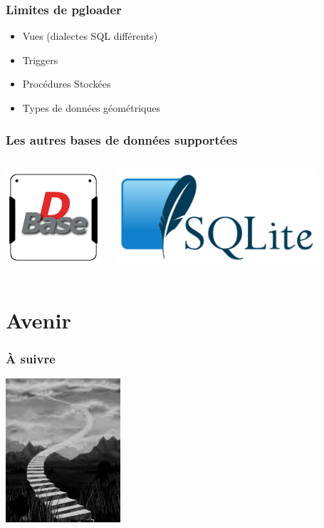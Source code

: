 \documentclass{beamer}
\begin{document}
\begin{frame}[fragile]
  \frametitle{Limites de pgloader}
  
  \vfill

  \begin{itemize}
  \item Vues (dialectes SQL différents)
  \item Triggers
  \item Procédures Stockées
  \item Types de données géométriques
  \end{itemize}  
\end{frame}


\begin{frame}
  \frametitle{Les autres bases de données supportées}

  \begin{columns}[c]
    \begin{center}
      \includegraphics[height=1.4in]{dBase.png}
    \end{center}

    \begin{center}
      \includegraphics[height=1.4in]{SQLite.png}
    \end{center}
  \end{columns}
\end{frame}

\section{Avenir}

\begin{frame}
  \frametitle{À suivre}

  \begin{center}
    \includegraphics[height=2.1in]{avenir.jpg}
  \end{center}
\end{frame}
\end{document}
